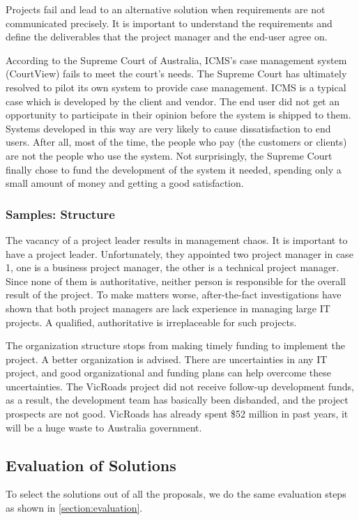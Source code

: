 Projects fail and lead to an alternative solution when requirements are not communicated precisely. It is important to understand the requirements and define the deliverables that the project manager and the end-user agree on.

According to the Supreme Court of Australia, ICMS’s case management system (CourtView) fails to meet the court’s needs. The Supreme Court has ultimately resolved to pilot its own system to provide case management. ICMS is a typical case which is developed by the client and vendor. The end user did not get an opportunity to participate in their opinion before the system is shipped to them. Systems developed in this way are very likely to cause dissatisfaction to end users. After all, most of the time, the people who pay (the customers or clients) are not the people who use the system. Not surprisingly, the Supreme Court finally chose to fund the development of the system it needed, spending only a small amount of money and getting a good satisfaction.

\subsubsection{Samples: Structure}
The vacancy of a project leader results in management chaos. It is important to have a project leader. Unfortunately, they appointed two project manager in case 1, one is a business project manager, the other is a technical project manager. Since none of them is authoritative, neither person is responsible for the overall result of the project. To make matters worse, after-the-fact investigations have shown that both project managers are lack experience in managing large IT projects. A qualified, authoritative is irreplaceable for such projects.

The organization structure stops from making timely funding to implement the project. A better organization is advised. There are uncertainties in any IT project, and good organizational and funding plans can help overcome these uncertainties. The VicRoads project did not receive follow-up development funds, as a result, the development team has basically been disbanded, and the project prospects are not good. VicRoads has already spent \$52 million in past years, it will be a huge waste to Australia government. 


\subsection{Evaluation of Solutions}
To select the solutions out of all the proposals, we do the same evaluation steps as shown in \ref{section:evaluation}.


